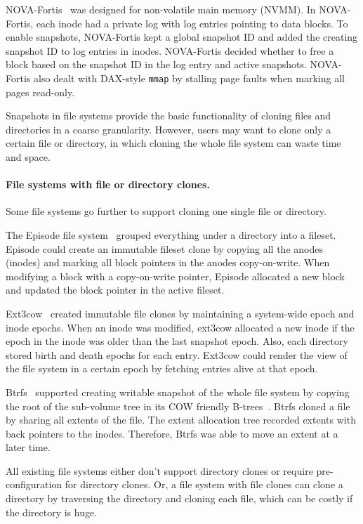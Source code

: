 NOVA-Fortis~\citep{nova} was designed for non-volatile main memory (NVMM).
In NOVA-Fortis, each inode had a private log with log entries pointing
to data blocks.
To enable snapshots, NOVA-Fortis kept a global snapshot ID and added the
creating snapshot ID to log entries in inodes.
NOVA-Fortis decided whether to free a block based on the snapshot ID in the log
entry and active snapshots.
NOVA-Fortis also dealt with DAX-style \texttt{mmap}
by stalling page faults when marking all pages read-only.

Snapshots in file systems provide the basic functionality of cloning files
and directories in a coarse granularity.
However, users may want to clone only a certain file or directory,
in which cloning the whole file system can waste time and space.

\paragraph{File systems with file or directory clones.}

Some file systems go further to support cloning one single file or directory.

The Episode file system~\citep{episode} grouped everything under a directory
into a fileset.
Episode could create an immutable fileset clone by copying all the anodes
(inodes) and marking all block pointers in the anodes copy-on-write.
When modifying a block with a copy-on-write pointer, Episode allocated a new
block and updated the block pointer in the active fileset.

Ext3cow~\citep{ext3cow} created immutable file clones by maintaining a
system-wide epoch and inode epochs.
When an inode was modified, ext3cow allocated a new inode if the epoch in the
inode was older than the last snapshot epoch.
Also, each directory stored birth and death epochs for each entry.
Ext3cow could render the view of the file system in a certain epoch by fetching
entries alive at that epoch.

Btrfs~\citep{btrfs} supported creating writable snapshot of
the whole file system
by copying the root of the sub-volume tree in its COW friendly
B-trees~\citep{cowbtree}.
Btrfs cloned a file by sharing all extents of the file.
The extent allocation tree recorded extents with back pointers to the inodes.
Therefore, Btrfs was able to move an extent at a later time.

All existing file systems either don't support directory clones
or require pre-configuration for directory clones.
Or, a file system with file clones can clone a directory by traversing the
directory and cloning each file,
which can be costly if the directory is huge.

